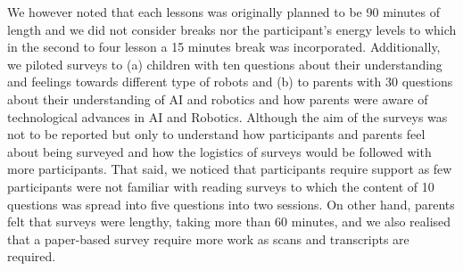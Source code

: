 \documentclass[conference]{IEEEtran}
\begin{document}
We however noted that each lessons was originally planned to be 90 minutes of length and we did not consider breaks nor the participant's energy levels to which in the second to four lesson a 15 minutes break was incorporated.
Additionally, we piloted surveys to (a) children with ten questions about their understanding and feelings towards different type of robots and (b) to parents with 30 questions about their understanding of AI and robotics and how parents were aware of  technological advances in AI and Robotics.
Although the aim of the surveys was not to be reported but only to understand how participants and parents feel about being surveyed and how the logistics of surveys would be followed with more participants.
That said, we noticed that participants require support as few participants were not familiar with reading surveys to which the content of 10 questions was spread into five questions into two sessions.
On other hand, parents felt that surveys were lengthy, taking more than 60 minutes, and we also realised that a paper-based survey require more work as scans and transcripts are required. 


    


\end{document}
